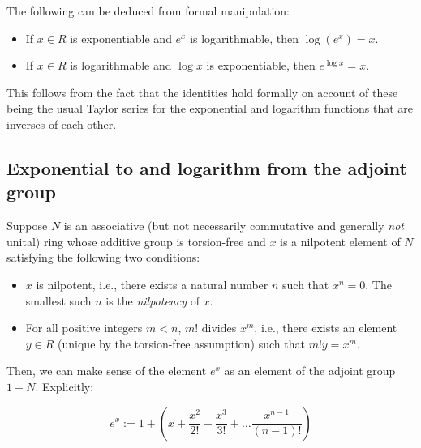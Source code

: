 The following can be deduced from formal manipulation:

\begin{itemize}
\item If $x \in R$ is exponentiable and $e^x$ is logarithmable, then
  $\log(e^x) = x$.
  
\item If $x \in R$ is logarithmable and $\log x$ is exponentiable, then
  $e^{\log x} = x$.

\end{itemize}

This follows from the fact that the identities hold formally on
account of these being the usual Taylor series for the exponential and
logarithm functions that are inverses of each other.
    
\subsection{Exponential to and logarithm from the adjoint group}\label{sec:exp-and-adjoint}

Suppose $N$ is an associative (but not necessarily commutative and
generally {\em not} unital) ring whose additive group is torsion-free
and $x$ is a nilpotent element of $N$ satisfying the following two
conditions:

\begin{itemize}
\item $x$ is nilpotent, i.e., there exists a natural number $n$ such
  that $x^n = 0$. The smallest such $n$ is the {\em nilpotency} of $x$.
\item For all positive integers $m < n$, $m!$ divides $x^m$, i.e.,
  there exists an element $y \in R$ (unique by the torsion-free
  assumption) such that $m!y = x^m$.
\end{itemize}

Then, we can make sense of the element $e^x$ as an element of the
adjoint group $1 + N$. Explicitly:

$$e^x := 1 + \left(x + \frac{x^2}{2!} + \frac{x^3}{3!} + \dots \frac{x^{n-1}}{(n - 1)!}\right)$$


